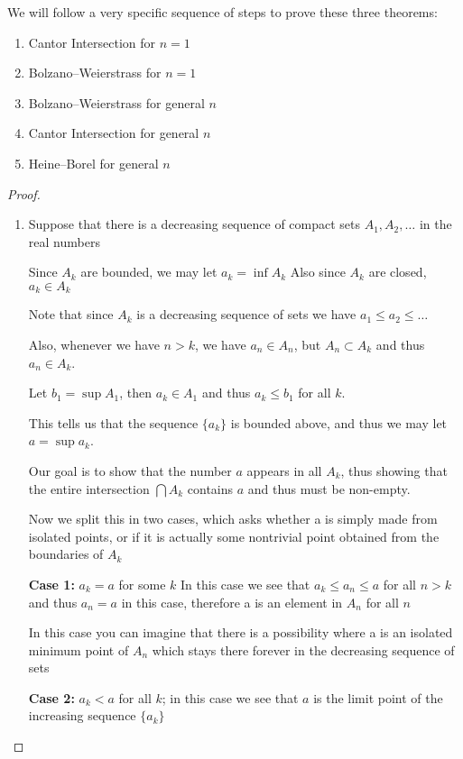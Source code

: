 We will follow a very specific sequence of steps to prove these three theorems:
\begin{enumerate}[label=(\alph*)]
\item Cantor Intersection for $n=1$
\item Bolzano--Weierstrass for $n=1$
\item Bolzano--Weierstrass for general $n$
\item Cantor Intersection for general $n$
\item Heine--Borel for general $n$
\end{enumerate}

\begin{proof} \
\begin{enumerate}[label=(\alph*)]
\item Suppose that there is a decreasing sequence of compact sets $A_1, A_2, \dots$ in the real numbers

Since $A_k$ are bounded, we may let $a_k=\inf A_k$
Also since $A_k$ are closed, $a_k \in A_k$

Note that since $A_k$ is a decreasing sequence of sets we have $a_1\le a_2\le\dots$

Also, whenever we have $n>k$, we have $a_n \in A_n$, but $A_n \subset A_k$ and thus $a_n \in A_k$.

Let $b_1=\sup A_1$, then $a_k \in A_1$ and thus $a_k\le b_1$ for all $k$.

This tells us that the sequence $\{a_k\}$ is bounded above, and thus we may let $a=\sup a_k$.

Our goal is to show that the number $a$ appears in all $A_k$, thus showing that the entire intersection $\bigcap A_k$ contains $a$ and thus must be non-empty.

Now we split this in two cases, which asks whether a is simply made from isolated points, or if it is actually some nontrivial point obtained from the boundaries of $A_k$

\textbf{Case 1:} $a_k=a$ for some $k$
In this case we see that $a_k\le a_n\le a$ for all $n>k$ and thus $a_n=a$ in this case, therefore a is an element in $A_n$ for all $n$

In this case you can imagine that there is a possibility where a is an isolated minimum point of $A_n$ which stays there forever in the decreasing sequence of sets

\textbf{Case 2:} $a_k<a$ for all $k$; in this case we see that $a$ is the limit point of the increasing sequence $\{a_k\}$


\end{enumerate}
\end{proof}
